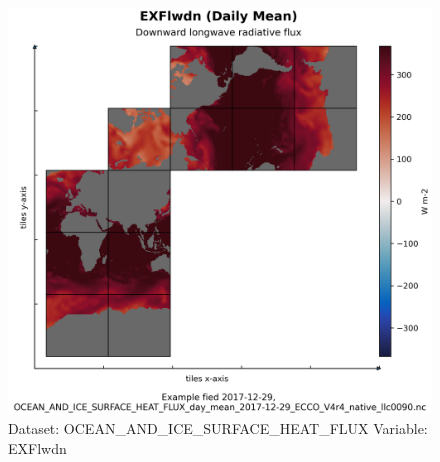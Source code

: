 \begin{figure}[H]
\centering
\includegraphics[scale=0.55]{../images/plots/native_plots/Ocean_and_Sea-Ice_Surface_Heat_Fluxes/EXFlwdn.png}
\caption{Dataset: OCEAN\_AND\_ICE\_SURFACE\_HEAT\_FLUX Variable: EXFlwdn}
\label{tab:table-OCEAN_AND_ICE_SURFACE_HEAT_FLUX_EXFlwdn-Plot}
\end{figure}
\pagebreak

